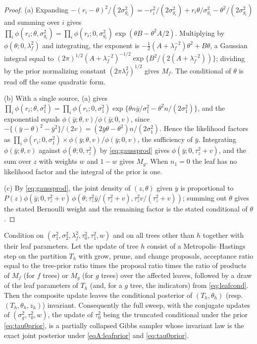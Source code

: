 \documentclass[11pt]{article}
\theoremstyle{definition}
\theoremstyle{plain}
\begin{document}
{\begin{proof}
(a) Expanding $-(r_i-\theta)^2/(2\sigma^2_{g_i})=-r_i^2/(2\sigma^2_{g_i})+r_i\theta/\sigma^2_{g_i}-\theta^2/(2\sigma^2_{g_i})$ and summing over $i$ gives
$\prod_i\phi(r_i;\theta,\sigma^2_{g_i})=\prod_i\phi(r_i;0,\sigma^2_{g_i})\exp(\theta B-\theta^2A/2)$. Multiplying by $\phi(\theta;0,\lambda_f^2)$ and integrating, the exponent is $-\tfrac12(A+\lambda_f^{-2})\theta^2+B\theta$, a Gaussian integral equal to $(2\pi)^{1/2}(A+\lambda_f^{-2})^{-1/2}\exp\{B^2/(2(A+\lambda_f^{-2}))\}$; dividing by the prior normalizing constant $(2\pi\lambda_f^2)^{1/2}$ gives $M_f$. The conditional of $\theta$ is read off the same quadratic form.

(b) With a single source, (a) gives $\prod_i\phi(r_i;\theta,\sigma_1^2)=\prod_i\phi(r_i;0,\sigma_1^2)\exp\{\theta n\bar y/\sigma_1^2-\theta^2n/(2\sigma_1^2)\}$, and the exponential equals $\phi(\bar y;\theta,v)/\phi(\bar y;0,v)$, since $-\{(\bar y-\theta)^2-\bar y^2\}/(2v)=(2\bar y\theta-\theta^2)n/(2\sigma_1^2)$. Hence the likelihood factors as $\prod_i\phi(r_i;0,\sigma_1^2)\times\phi(\bar y;\theta,v)/\phi(\bar y;0,v)$, the sufficiency of $\bar y$. Integrating $\phi(\bar y;\theta,v)$ against $\phi(\theta;0,\tau_z^2)$ by \eqref{eq:gaussprod} gives $\phi(\bar y;0,\tau_z^2+v)$, and the sum over $z$ with weights $w$ and $1-w$ gives $M_g$. When $n_1=0$ the leaf has no likelihood factor and the integral of the prior is one.

(c) By \eqref{eq:gaussprod}, the joint density of $(z,\theta)$ given $\bar y$ is proportional to $P(z)\phi(\bar y;0,\tau_z^2+v)\,\phi(\theta;\tau_z^2\bar y/(\tau_z^2+v),\tau_z^2v/(\tau_z^2+v))$; summing out $\theta$ gives the stated Bernoulli weight and the remaining factor is the stated conditional of $\theta$.
\end{proof}

\begin{propA}\label{prop:exact}
Condition on $(\sigma_1^2,\sigma_2^2,\lambda_f^2,\tau_0^2,\tau_1^2,w)$ and on all trees other than $h$ together with their leaf parameters. Let the update of tree $h$ consist of a Metropolis--Hastings step on the partition $T_h$ with grow, prune, and change proposals, acceptance ratio equal to the tree-prior ratio times the proposal ratio times the ratio of products of $M_f$ (for $f$ trees) or $M_g$ (for $g$ trees) over the affected leaves, followed by a draw of the leaf parameters of $T_h$ (and, for a $g$ tree, the indicators) from \eqref{eq:leafcond}. Then the composite update leaves the conditional posterior of $(T_h,\theta_h)$ (resp.\ $(T_h,\theta_h,z_h)$) invariant. Consequently the full sweep, with the conjugate updates of $(\sigma_g^2,\tau_0^2,w)$, the update of $\tau_0^2$ being the truncated conditional under the prior \eqref{eq:tau0prior}, is a partially collapsed Gibbs sampler whose invariant law is the exact joint posterior under \eqref{eqA:leafprior} and \eqref{eq:tau0prior}.
\end{propA}

}
\end{document}

